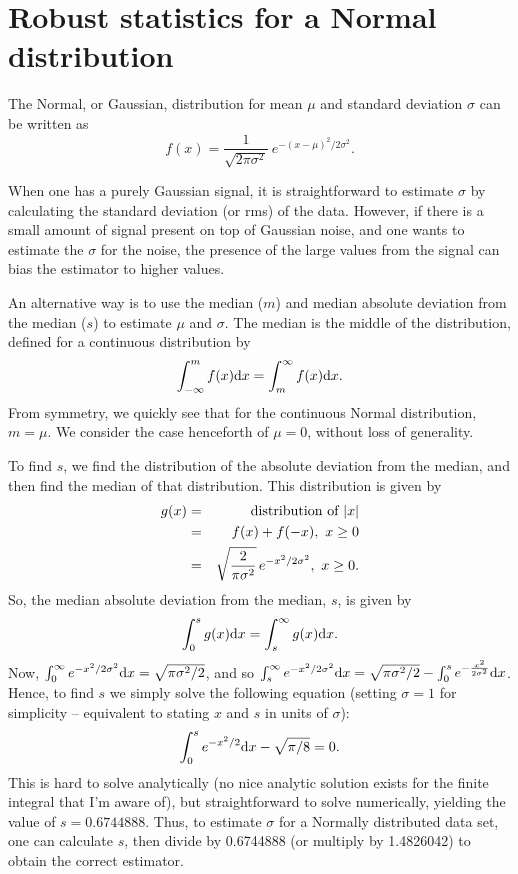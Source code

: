\documentclass[12pt,a4paper]{article}
\newcommand{\diff}{{\rm d}}
\begin{document}
\section{Robust statistics for a Normal distribution}
\label{app-madfm}

The Normal, or Gaussian, distribution for mean $\mu$ and standard
deviation $\sigma$ can be written as 
\[ 
f(x) = \frac{1}{\sqrt{2\pi\sigma^2}}\ e^{-(x-\mu)^2/2\sigma^2}.
 \]

When one has a purely Gaussian signal, it is straightforward to
estimate $\sigma$ by calculating the standard deviation (or rms) of
the data. However, if there is a small amount of signal present on top
of Gaussian noise, and one wants to estimate the $\sigma$ for the
noise, the presence of the large values from the signal can bias the
estimator to higher values.

An alternative way is to use the median ($m$) and median absolute deviation
from the median ($s$) to estimate $\mu$ and $\sigma$. The median is the
middle of the distribution, defined for a continuous distribution by
\[
\int_{-\infty}^{m} f(x) \diff x = \int_{m}^{\infty} f(x) \diff x.
\]
From symmetry, we quickly see that for the continuous Normal
distribution, $m=\mu$. We consider the case henceforth of $\mu=0$,
without loss of generality.

To find $s$, we find the distribution of the absolute deviation from
the median, and then find the median of that distribution. This
distribution is given by
\begin{eqnarray*}
g(x) &= &{\mbox{\rm distribution of }} |x|\\
     &= &f(x) + f(-x),\ x\ge0\\
     &= &\sqrt{\frac{2}{\pi\sigma^2}}\, e^{-x^2/2\sigma^2},\ x\ge0.
\end{eqnarray*}
So, the median absolute deviation from the median, $s$, is given by
\[
\int_{0}^{s} g(x) \diff x = \int_{s}^{\infty} g(x) \diff x.
\]
Now, $\int_{0}^{\infty}e^{-x^2/2\sigma^2} \diff x = \sqrt{\pi\sigma^2/2}$, and
so $\int_{s}^{\infty} e^{-x^2/2\sigma^2} \diff x =
\sqrt{\pi\sigma^2/2} - \int_{0}^{s} e^{-\frac{x^2}{2\sigma^2}} \diff x
$. Hence, to find $s$ we simply solve the following equation (setting $\sigma=1$ for
simplicity -- equivalent to stating $x$ and $s$ in units of $\sigma$):
\[
\int_{0}^{s}e^{-x^2/2} \diff x - \sqrt{\pi/8} = 0.
\]
This is hard to solve analytically (no nice analytic solution exists
for the finite integral that I'm aware of), but straightforward to
solve numerically, yielding the value of $s=0.6744888$. Thus, to
estimate $\sigma$ for a Normally distributed data set, one can calculate
$s$, then divide by 0.6744888 (or multiply by 1.4826042) to obtain the
correct estimator.
\end{document}

